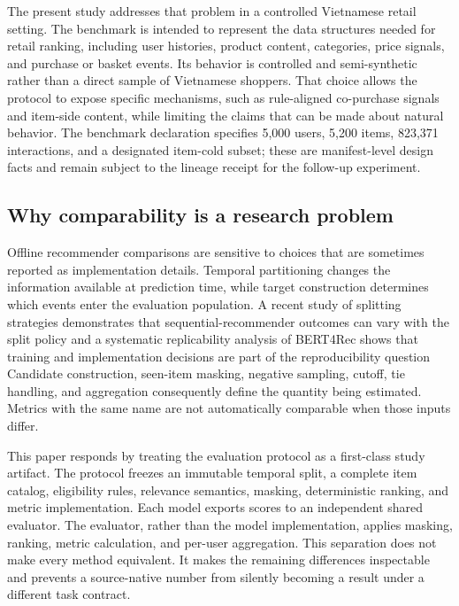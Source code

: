 \documentclass[10pt,a4paper]{article}
\begin{document}
The present study addresses that problem in a controlled Vietnamese retail
setting. The benchmark is intended to represent the data structures needed for
retail ranking, including user histories, product content, categories, price
signals, and purchase or basket events. Its behavior is controlled and
semi-synthetic rather than a direct sample of Vietnamese shoppers. That choice
allows the protocol to expose specific mechanisms, such as rule-aligned
co-purchase signals and item-side content, while limiting the claims that can be
made about natural behavior. The benchmark declaration specifies 5,000 users,
5,200 items, 823,371 interactions, and a designated item-cold subset; these are
manifest-level design facts and remain subject to the lineage receipt for the
follow-up experiment.

\subsection{Why comparability is a research problem}

Offline recommender comparisons are sensitive to choices that are sometimes
reported as implementation details. Temporal partitioning changes the
information available at prediction time, while target construction determines
which events enter the evaluation population. A recent study of splitting
strategies demonstrates that sequential-recommender outcomes can vary with the
split policy
\cite{gusak2025_time_split} %
and a systematic replicability analysis of BERT4Rec shows that training and
implementation decisions are part of the reproducibility question
\cite{petrov2022_a_systematic_review_and_replicability_study_of_bert4rec_fo} %
Candidate construction, seen-item masking, negative sampling, cutoff, tie
handling, and aggregation consequently define the quantity being estimated.
Metrics with the same name are not automatically comparable when those inputs
differ.

This paper responds by treating the evaluation protocol as a first-class study
artifact. The protocol freezes an immutable temporal split, a complete item
catalog, eligibility rules, relevance semantics, masking, deterministic ranking,
and metric implementation. Each model exports scores to an independent shared
evaluator. The evaluator, rather than the model implementation, applies
masking, ranking, metric calculation, and per-user aggregation. This separation
does not make every method equivalent. It makes the remaining differences
inspectable and prevents a source-native number from silently becoming a result
under a different task contract.
\end{document}
